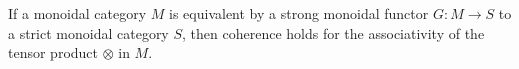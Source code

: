 If a monoidal category $M$ is equivalent by a strong monoidal functor $G : M \rightarrow S$ to a strict monoidal category $S$, then coherence holds for the associativity of the tensor product $\otimes$ in $M$.
